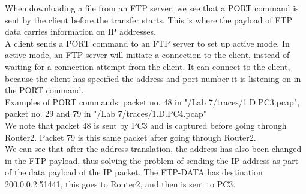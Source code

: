 When downloading a file from an FTP server, we see that a PORT command is sent by the client before the transfer starts.
This is where the payload of FTP data carries information on IP addresses. \\ 
A client sends a PORT command to an FTP server to set up active mode. In active mode, an FTP server will initiate a connection to the client, instead of waiting for a connection attempt from the client. It can connect to the client, because the client has specified the address and port number it is listening on in the PORT command. \\

Examples of PORT commands: packet no. 48 in "/Lab 7/traces/1.D.PC3.pcap", packet no. 29 and 79 in "/Lab 7/traces/1.D.PC4.pcap" \\

We note that packet 48 is sent by PC3 and is captured before going through Router2. Packet 79 is this same packet after going through Router2. \\
We can see that after the address translation, the address has also been changed in the FTP payload, thus solving the problem of sending the IP address as part of the data payload of the IP packet. The FTP-DATA has destination 200.0.0.2:51441, this goes to Router2, and then is sent to PC3.
